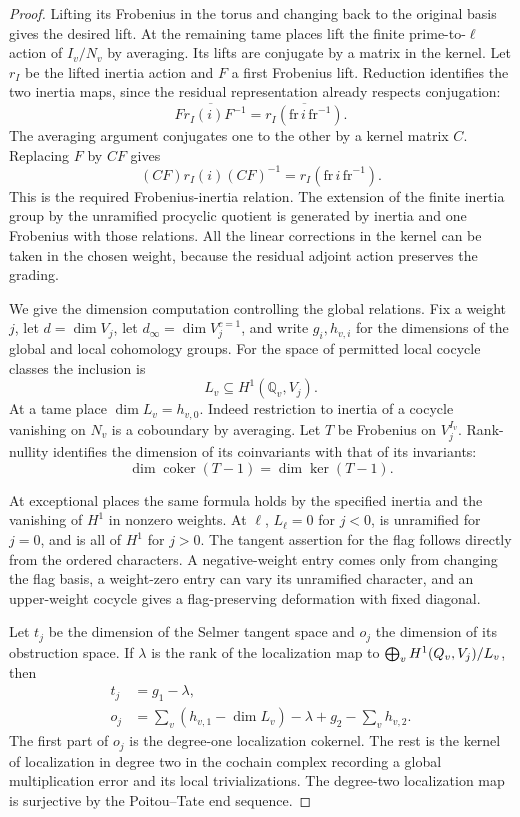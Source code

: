 \begin{proof}
Lifting its
Frobenius in the torus and changing back to the original
basis gives the desired lift. At the remaining tame
places lift the finite prime-to-\(\ell\) action of
\(I_v/N_v\) by averaging. Its lifts are conjugate by
a matrix in the kernel. Let \(r_I\) be the lifted inertia action and \(F\) a first Frobenius lift. Reduction identifies the two inertia maps, since the residual representation already respects conjugation:
\[
 \overline{F r_I(i) F^{-1}}=\overline{r_I(\mathrm{fr}\,i\,\mathrm{fr}^{-1})}.
\] The averaging argument conjugates
one to the other by a kernel matrix \(C\). Replacing \(F\)
by \(CF\) gives
\[
         (CF)r_I(i)(CF)^{-1}
                    =r_I(\mathrm{fr}\,i\,\mathrm{fr}^{-1}).
\]
This is the required Frobenius-inertia relation. The
extension of the finite inertia group by the unramified
procyclic quotient is generated by inertia and one
Frobenius with those relations. All the linear
corrections in the kernel can be taken in the chosen
weight, because the residual adjoint action preserves
the grading.

We give the dimension computation controlling the global
relations. Fix a weight \(j\), let \(d=\dim V_j\),
let \(d_\infty=\dim V_j^{c=1}\), and write \(g_i,h_{v,i}\)
for the dimensions of the global and local cohomology
groups. For the space of permitted local cocycle classes the inclusion is
\[
 L_v\subseteq H^1(\mathbb Q_v,V_j).
\] At a tame place
\(\dim L_v=h_{v,0}\). Indeed restriction to inertia
of a cocycle vanishing on \(N_v\) is a coboundary by
averaging. Let \(T\) be Frobenius on \(V_j^{I_v}\). Rank-nullity identifies the dimension of its coinvariants with that of its invariants:
\[
 \dim\operatorname{coker}(T-1)=\dim\ker(T-1).
\]

At exceptional places the same
formula holds by the specified inertia and the
vanishing of \(H^1\) in nonzero weights.
At \(\ell\), \(L_\ell=0\) for \(j<0\), is unramified
for \(j=0\), and is all of \(H^1\) for \(j>0\).
The tangent assertion for the flag follows directly
from the ordered characters. A negative-weight
entry comes only from changing the flag basis, a
weight-zero entry can vary its unramified character,
and an upper-weight cocycle gives a flag-preserving
deformation with fixed diagonal.

Let \(t_j\) be the dimension of the Selmer tangent
space and \(o_j\) the dimension of its obstruction
space. If \(\lambda\) is the rank of the localization
map to \(\bigoplus_v H^1(Q_v,V_j)/L_v\), then
\[
 \begin{split}
 t_j&=g_1-\lambda,\\
 o_j&=\sum_v (h_{v,1}-\dim L_v)-\lambda
        +g_2-\sum_v h_{v,2}.
 \end{split}
 \tag{7}\label{eq:local-length-7}
\]
The first part of \(o_j\) is the degree-one localization
cokernel. The rest is the kernel of localization in
degree two in the cochain complex recording a global
multiplication error and its local trivializations.
The degree-two localization map is surjective by the
Poitou--Tate end sequence.


\end{proof}
